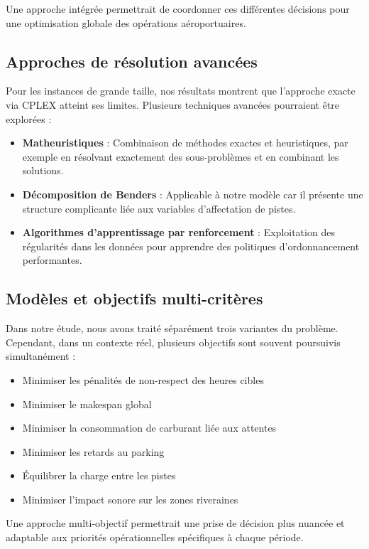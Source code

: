 \documentclass[a4paper,12pt]{report}
\begin{document}
Une approche intégrée permettrait de coordonner ces différentes décisions pour une optimisation globale des opérations aéroportuaires.

\subsection{Approches de résolution avancées}
Pour les instances de grande taille, nos résultats montrent que l'approche exacte via CPLEX atteint ses limites. Plusieurs techniques avancées pourraient être explorées :

\begin{itemize}
  \item \textbf{Matheuristiques} : Combinaison de méthodes exactes et heuristiques, par exemple en résolvant exactement des sous-problèmes et en combinant les solutions.
  \item \textbf{Décomposition de Benders} : Applicable à notre modèle car il présente une structure complicante liée aux variables d'affectation de pistes.
  \item \textbf{Algorithmes d'apprentissage par renforcement} : Exploitation des régularités dans les données pour apprendre des politiques d'ordonnancement performantes.
\end{itemize}

\subsection{Modèles et objectifs multi-critères}
Dans notre étude, nous avons traité séparément trois variantes du problème. Cependant, dans un contexte réel, plusieurs objectifs sont souvent poursuivis simultanément :

\begin{itemize}
  \item Minimiser les pénalités de non-respect des heures cibles
  \item Minimiser le makespan global
  \item Minimiser la consommation de carburant liée aux attentes
  \item Minimiser les retards au parking
  \item Équilibrer la charge entre les pistes
  \item Minimiser l'impact sonore sur les zones riveraines
\end{itemize}

Une approche multi-objectif permettrait une prise de décision plus nuancée et adaptable aux priorités opérationnelles spécifiques à chaque période.
\end{document}

